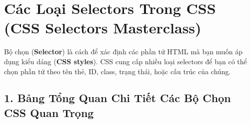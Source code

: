 \documentclass[11pt,oneside]{book}
\newcommand{\term}[1]{\textbf{\textcolor{primaryBlue}{#1}}}
\begin{document}
\section{Các Loại Selectors Trong CSS (CSS Selectors Masterclass)}


Bộ chọn (\term{Selector}) là cách để xác định các phần tử HTML mà bạn muốn áp dụng kiểu dáng (\term{CSS styles}). CSS cung cấp nhiều loại selectors để bạn có thể chọn phần tử theo tên thẻ, ID, class, trạng thái, hoặc cấu trúc của chúng.

\subsection{1. Bảng Tổng Quan Chi Tiết Các Bộ Chọn CSS Quan Trọng}
\end{document}
